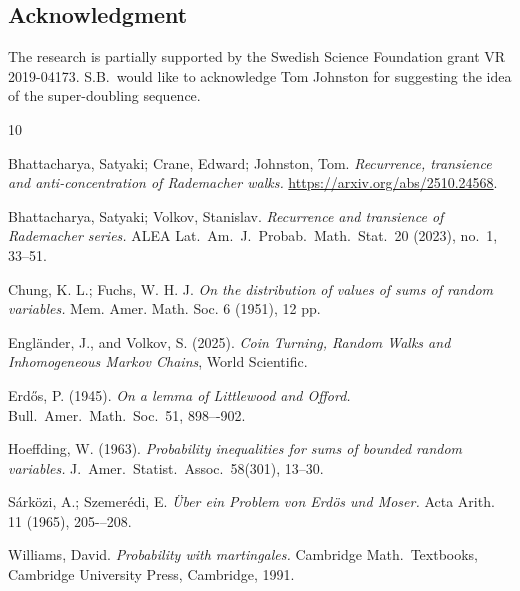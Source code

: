 \documentclass[12pt]{article}
\begin{document}
\subsection*{Acknowledgment}
The research is partially supported by the Swedish Science Foundation grant VR 2019-04173. S.B.~would like to acknowledge Tom Johnston for suggesting the idea of the super-doubling sequence. 





\begin{thebibliography}{10}

 Bhattacharya, Satyaki;  Crane, Edward;  Johnston, Tom. \textit{Recurrence, transience and anti-concentration of Rademacher walks.} \href{https://arxiv.org/abs/2510.24568}{https://arxiv.org/abs/2510.24568}.

 Bhattacharya, Satyaki; Volkov, Stanislav. \textit{Recurrence and transience of Rademacher series.} ALEA Lat.\ Am.\ J.\ Probab.\ Math.\ Stat.\ 20 (2023), no.~1, 33--51.

 Chung, K. L.; Fuchs, W. H. J. \textit{On the distribution of values of sums of random variables.} Mem. Amer. Math. Soc. 6 (1951), 12 pp.

 Engl\"ander, J., and  Volkov, S. (2025).  \textit{Coin Turning, Random Walks and Inhomogeneous Markov Chains}, World Scientific.

 Erd\H{o}s, P. (1945). \textit{On a lemma of Littlewood and Offord.} Bull.\ Amer.\ Math.\ Soc.~51, 898–-902.

 Hoeffding, W. (1963). \textit{Probability inequalities for sums of bounded random variables.} J.\ Amer.\ Statist.\ Assoc.~58(301), 13--30.

 S\'ark\"ozi, A.; Szemer\'edi, E. \textit{\"Uber ein Problem von Erd\"os und Moser.} Acta Arith. 11 (1965), 205-–208.

 Williams, David.  \textit{Probability with martingales.} Cambridge Math.\ Textbooks, Cambridge University Press, Cambridge, 1991.
\end{thebibliography}
\end{document}
